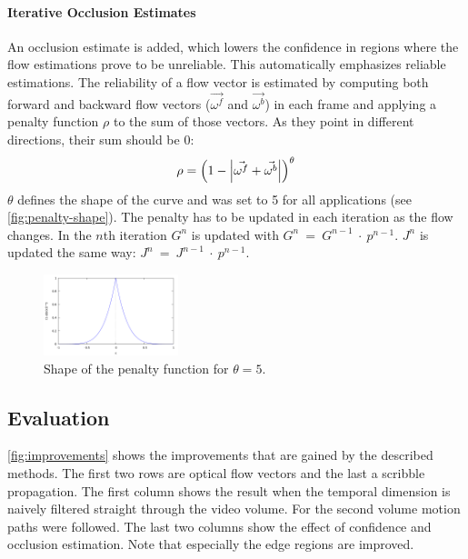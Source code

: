 \paragraph{Iterative Occlusion Estimates} \label{iterative-occlusion-estimates}
An occlusion estimate is added, which lowers the confidence in regions where
the flow estimations prove to be unreliable. This automatically emphasizes
reliable estimations. The reliability of a flow vector is estimated by
computing both forward and backward flow vectors ($\vec{\omega^f}$ and
$\vec{\omega^b}$) in each frame and applying a penalty function $\rho$ to the
sum of those vectors. As they point in different directions, their sum should
be 0:
\begin{equation}
  \rho = \left(1-\left| \vec{\omega^f} + \vec{\omega^b} \right|\right)^{\theta}
  \label{eq:penalty}
\end{equation}
$\theta$ defines the shape of the curve and was set to 5 for all applications
(see \autoref{fig:penalty-shape}).
The penalty has to be updated in each iteration as the flow changes. In the
$n$th iteration $G^n$ is updated with $G^n~=~G^{n-1}~\cdot~p^{n-1}$. $J^n$ is
updated the same way: $J^n~=~J^{n-1}~\cdot~p^{n-1}$.

\begin{figure}[htb]
  \centering
  \includegraphics[width=0.35\textwidth]{images/penalty.png}
  \caption{Shape of the penalty function for $\theta = 5$.}
  \label{fig:penalty-shape}
\end{figure}

\subsection{Evaluation} \label{evaluation}
\autoref{fig:improvements} shows the improvements that are gained by the
described methods. The first two rows are optical flow vectors and the last a
scribble propagation. The first column shows the result when the temporal
dimension is naively filtered straight through the video volume. For the second
volume motion paths were followed. The last two columns show the effect of
confidence and occlusion estimation. Note that especially the edge regions are
improved.

